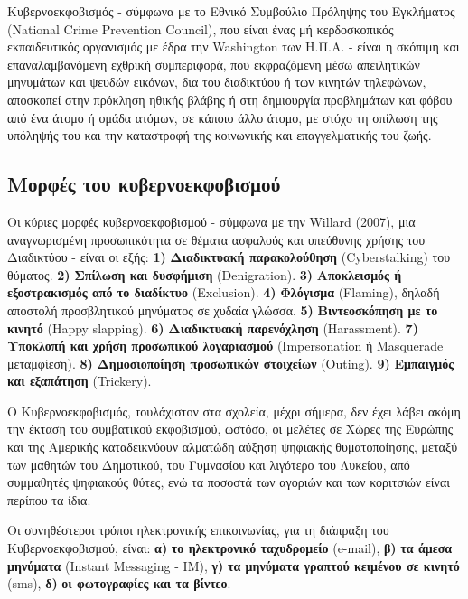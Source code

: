 \documentclass[12pt,a4paper,oneside]{book}
\begin{document}
\indent Κυβερνοεκφοβισμός - σύμφωνα με το Εθνικό Συμβούλιο Πρόληψης του
Εγκλήματος (National Crime Prevention Council), που είναι ένας μή κερδοσκοπικός εκπαιδευτικός οργανισμός με έδρα την Washington των
Η.Π.Α. -  είναι η σκόπιμη και επαναλαμβανόμενη εχθρική συμπεριφορά, που
εκφραζόμενη μέσω απειλητικών μηνυμάτων και ψευδών εικόνων, δια του διαδικτύου ή
των κινητών τηλεφώνων, αποσκοπεί στην πρόκληση ηθικής βλάβης ή στη  δημιουργία
προβλημάτων και φόβου από ένα άτομο ή ομάδα ατόμων, σε κάποιο άλλο άτομο, με
στόχο τη σπίλωση της υπόληψής του και την καταστροφή της κοινωνικής και
επαγγελματικής του ζωής.
\subsection*{Μορφές του κυβερνοεκφοβισμού}
\indent Οι κύριες μορφές κυβερνοεκφοβισμού - σύμφωνα με την Willard
(\num{2007}), μια αναγνωρισμένη προσωπικότητα σε θέματα ασφαλούς και υπεύθυνης
χρήσης του Διαδικτύου - είναι οι εξής: \textbf{1)} \textbf{Διαδικτυακή
παρακολούθηση} (Cyberstalking) του θύματος. \textbf{2)} \textbf{Σπίλωση και
δυσφήμιση} (Denigration). \textbf{3)} \textbf{Αποκλεισμός ή εξοστρακισμός από το
διαδίκτυο} (Exclusion). \textbf{4)} \textbf{Φλόγισμα} (Flaming), δηλαδή αποστολή
προσβλητικού μηνύματος σε χυδαία γλώσσα. \textbf{5)}
\textbf{Βιντεοσκόπηση με το κινητό} (Happy slapping). \textbf{6)}
\textbf{Διαδικτυακή παρενόχληση} (Harassment). \textbf{7)} \textbf{Υποκλοπή και
χρήση προσωπικού λογαριασμού} (Impersonation ή Masquerade μεταμφίεση).
\textbf{8)} \textbf{Δημοσιοποίηση προσωπικών στοιχείων} (Outing). \textbf{9)}
\textbf{Εμπαιγμός και εξαπάτηση} (Trickery).

\indent Ο Kυβερνοεκφοβισμός, τουλάχιστον στα σχολεία, μέχρι σήμερα, δεν έχει
λάβει ακόμη την έκταση του συμβατικού εκφοβισμού, ωστόσο, οι μελέτες σε Xώρες της Ευρώπης και της Αμερικής
καταδεικνύουν αλματώδη αύξηση ψηφιακής θυματοποίησης, μεταξύ των μαθητών του
Δημοτικού, του Γυμνασίου και λιγότερο του Λυκείου, από συμμαθητές ψηφιακούς
θύτες, ενώ τα ποσοστά των αγοριών και των κοριτσιών είναι περίπου τα ίδια.

\indent Οι συνηθέστεροι τρόποι ηλεκτρονικής επικοινωνίας, για τη διάπραξη του
Kυβερνοεκφοβισμού, είναι: \textbf{α)} \textbf{το ηλεκτρονικό ταχυδρομείο} (e-mail), \textbf{β)} \textbf{τα άμεσα μηνύματα} (Instant Messaging - IM),
\textbf{γ)} \textbf{τα μηνύματα γραπτού κειμένου σε κινητό} (sms), \textbf{δ)}
\textbf{οι φωτογραφίες και τα βίντεο}. 
\end{document}
